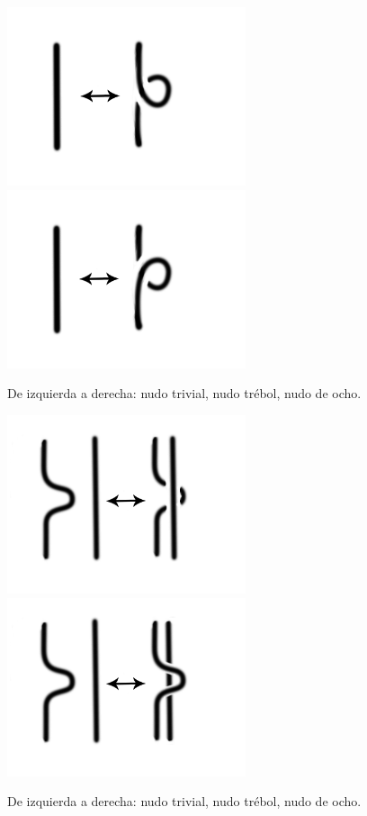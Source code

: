 \documentclass[14pt]{extarticle}
\begin{document}
  \begin{figure}[h!]
  	\includegraphics[width=7cm]{movi1.png}
  	\includegraphics[width=7cm]{movi2.png}
  	\centering
  	\caption{De izquierda a derecha: nudo trivial, nudo trébol, nudo de ocho.}
  	\label{movi1} 
  \end{figure}
  
    \begin{figure}[h!]
    	\includegraphics[width=7cm]{movi3.png}
    	\includegraphics[width=7cm]{movi4.png}
    	\centering
    	\caption{De izquierda a derecha: nudo trivial, nudo trébol, nudo de ocho.}
    	\label{movi2} 
    \end{figure}
    
\end{document}
